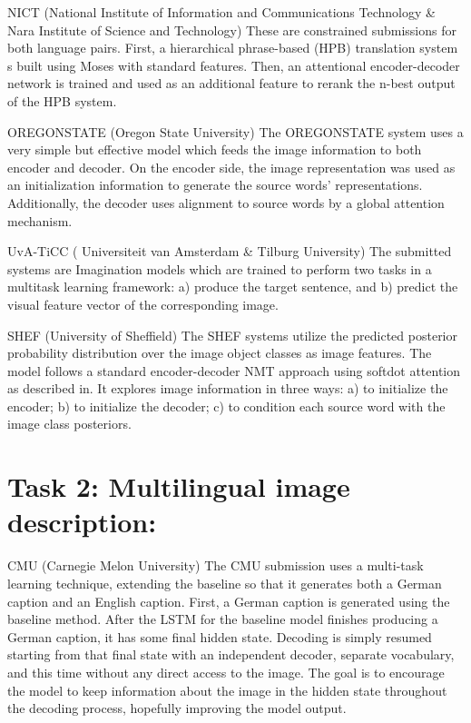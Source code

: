 \documentclass[presentation]{beamer}
\begin{document}
\begin{frame}[label={sec:org39c3f55}]{NICT (National Institute of Information and Communications Technology \& Nara Institute of Science and Technology)}
These are constrained submissions for both language pairs. First, a hierarchical phrase-based (HPB) translation system s built using Moses with standard features. Then, an attentional encoder-decoder network is trained and used as an additional feature to rerank the n-best output of the HPB system.
\end{frame}

\begin{frame}[label={sec:org9d4a13d}]{OREGONSTATE (Oregon State University)}
The OREGONSTATE system uses a very simple but effective model which feeds the image information to both encoder and decoder. On the encoder side, the image representation was used as an initialization information to generate the source words’ representations. Additionally, the decoder uses alignment to source words by a global attention mechanism.
\end{frame}

\begin{frame}[label={sec:org2b84fe9}]{UvA-TiCC ( Universiteit van Amsterdam \& Tilburg University)}
The submitted systems are Imagination models which are trained to perform two tasks in a multitask learning framework: a) produce the target sentence, and b) predict the visual feature vector of the corresponding image.
\end{frame}

\begin{frame}[label={sec:org4fa7fff}]{SHEF (University of Sheffield)}
The SHEF systems utilize the predicted posterior probability distribution over the image object classes as image features. The model follows a standard encoder-decoder NMT approach using softdot attention as described in. It explores image information in three ways: a) to initialize the encoder; b) to initialize the decoder; c) to condition each source word with the image class posteriors.
\end{frame}

\section{Task 2: Multilingual image description:}
\label{sec:orgac5a965}

\begin{frame}[label={sec:orgb223a76}]{CMU (Carnegie Melon University)}
The CMU submission uses a multi-task learning technique, extending the baseline so that it generates both a German caption and an English caption. First, a German caption is generated using the baseline method. After the LSTM for the baseline model finishes producing a German caption, it has some final hidden state. Decoding is simply resumed starting from that final state with an independent decoder, separate vocabulary, and this time without any direct access to the image. The goal is to encourage the model to keep information about the image in the hidden state throughout the decoding process, hopefully improving the model output.
\end{frame}
\end{document}
